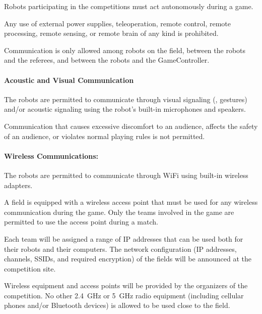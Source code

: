 \label{sec:communication}

Robots participating in the \leaguenameabbr competitions must act autonomously during a game. 

Any use of external power supplies, teleoperation, remote control, remote processing, remote sensing, or remote brain of any kind is prohibited.

Communication is only allowed among robots on the field, between the robots and the referees, and between the robots and the GameController.

\paragraph{Acoustic and Visual Communication}
\label{sec:acoustic}


The robots are permitted to communicate through visual signaling (\eg, gestures) and/or acoustic signaling using the robot's built-in microphones and speakers.

Communication that causes excessive discomfort to an audience, affects the safety of an audience, or violates normal playing rules is not permitted.


\paragraph{Wireless Communications:}
\label{sec:wireless}

The robots are permitted to communicate through WiFi using built-in wireless adapters. 

A field is equipped with a wireless access point that must be used for any wireless communication during the game.
Only the teams involved in the game are permitted to use the access point during a match.

Each team will be assigned a range of IP addresses that can be used both for their robots and their computers.
The network configuration (\eg IP addresses, channels, SSIDs, and required encryption) of the fields will be announced at the competition site.

Wireless equipment and access points will be provided by the organizers of the competition.
No other \qty{2.4}{\giga\hertz} or \qty{5}{\giga\hertz} radio equipment (including cellular phones and/or Bluetooth devices) is allowed to be used close to the field.


